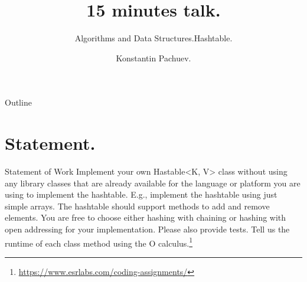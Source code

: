 \documentclass{beamer}
\title{15 minutes talk.}
\subtitle{Algorithms and Data Structures.}
\subtitle{Hashtable.}
\author{Konstantin Pachuev.}
\begin{document}
\begin{frame}
  \maketitle
\end{frame}

\begin{frame}{Outline}
  \tableofcontents
\end{frame}

\section{Statement.}

\begin{frame}{Statement of Work}
  Implement your own Hastable<K, V> class without using any library classes that are already
  available for the language or platform you are using to implement the hashtable.
  E.g., implement the hashtable using just simple arrays. The hashtable should support methods
  to add and remove elements. You are free to choose either hashing with chaining or hashing
  with open addressing for your implementation. Please also provide tests. Tell us the runtime
  of each class method using the O calculus.\footnote{\url{https://www.esrlabs.com/coding-assignments/}}
\end{frame}
\end{document}
